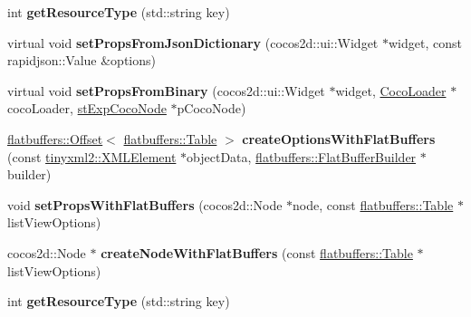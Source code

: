 \begin{DoxyCompactItemize}
int {\bfseries get\+Resource\+Type} (std\+::string key)
\item 
\mbox{\label{classcocostudio_1_1ListViewReader_a4902451a83baceda9367923ac0fe42e3}} 
virtual void {\bfseries set\+Props\+From\+Json\+Dictionary} (cocos2d\+::ui\+::\+Widget $\ast$widget, const rapidjson\+::\+Value \&options)
\item 
\mbox{\label{classcocostudio_1_1ListViewReader_a4a2e5c28d1885e24b5f56049d0681868}} 
virtual void {\bfseries set\+Props\+From\+Binary} (cocos2d\+::ui\+::\+Widget $\ast$widget, \hyperlink{classcocostudio_1_1CocoLoader}{Coco\+Loader} $\ast$coco\+Loader, \hyperlink{structcocostudio_1_1stExpCocoNode}{st\+Exp\+Coco\+Node} $\ast$p\+Coco\+Node)
\item 
\mbox{\label{classcocostudio_1_1ListViewReader_abdb70c7e7424c072086ae181910caf0b}} 
\hyperlink{structflatbuffers_1_1Offset}{flatbuffers\+::\+Offset}$<$ \hyperlink{classflatbuffers_1_1Table}{flatbuffers\+::\+Table} $>$ {\bfseries create\+Options\+With\+Flat\+Buffers} (const \hyperlink{classtinyxml2_1_1XMLElement}{tinyxml2\+::\+X\+M\+L\+Element} $\ast$object\+Data, \hyperlink{classflatbuffers_1_1FlatBufferBuilder}{flatbuffers\+::\+Flat\+Buffer\+Builder} $\ast$builder)
\item 
\mbox{\label{classcocostudio_1_1ListViewReader_a7f52e57aa65b1d8501e73a51437a4cb5}} 
void {\bfseries set\+Props\+With\+Flat\+Buffers} (cocos2d\+::\+Node $\ast$node, const \hyperlink{classflatbuffers_1_1Table}{flatbuffers\+::\+Table} $\ast$list\+View\+Options)
\item 
\mbox{\label{classcocostudio_1_1ListViewReader_af1ae9361be99a6e6737683aea3cba9e2}} 
cocos2d\+::\+Node $\ast$ {\bfseries create\+Node\+With\+Flat\+Buffers} (const \hyperlink{classflatbuffers_1_1Table}{flatbuffers\+::\+Table} $\ast$list\+View\+Options)
\item 
\mbox{\label{classcocostudio_1_1ListViewReader_af440c56ebeaf19bdaed886356d673a96}} 
int {\bfseries get\+Resource\+Type} (std\+::string key)
\end{DoxyCompactItemize}
